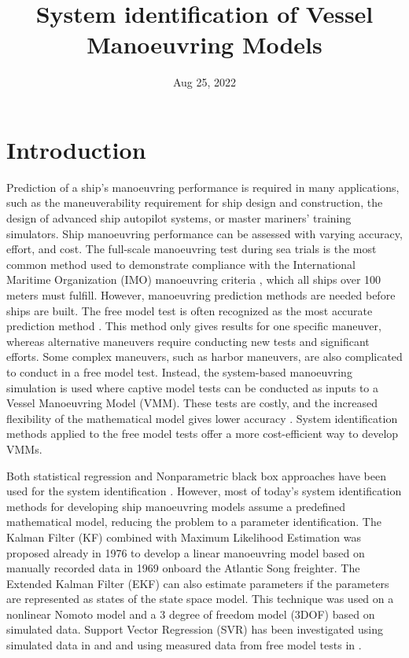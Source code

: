 \documentclass[review]{elsarticle}
\title{System identification of Vessel Manoeuvring Models}
\date{Aug 25, 2022}
\begin{document}



\pagestyle{empty}

\pagestyle{plain}

\pagestyle{normal}
\label{\detokenize{index::doc}}



\section{Introduction}
\label{\detokenize{00.02_introduction:introduction}}\label{\detokenize{00.02_introduction::doc}}
% 
Prediction of a ship's manoeuvring performance is required in many applications, such as the maneuverability requirement for ship design and construction, the design of advanced ship autopilot systems, or master mariners' training simulators. Ship manoeuvring performance can be assessed with varying accuracy, effort, and cost. The full-scale manoeuvring test during sea trials is the most common method used to demonstrate compliance with the International Maritime Organization (IMO) manoeuvring criteria \cite{imo_standards_2002}, which all ships over 100 meters must fulfill. However, manoeuvring prediction methods are needed before ships are built. The free model test is often recognized as the most accurate prediction method \cite{ittc_maneuvering_2008}.
This method only gives results for one specific maneuver, whereas alternative maneuvers require conducting new tests and significant efforts. Some complex maneuvers, such as harbor maneuvers, are also complicated to conduct in a free model test.
Instead, the system-based manoeuvring simulation is used where captive model tests can be conducted as inputs to a Vessel Manoeuvring Model (VMM). These tests are costly, and the increased flexibility of the mathematical model gives lower accuracy \cite{ittc_maneuvering_2008}.
System identification methods applied to the free model tests offer a more cost-efficient way to develop VMMs.

Both statistical regression and Non\sphinxhyphen{}parametric black box approaches have been used for the system identification \cite{he_nonparametric_2022}.  However, most of today's system identification methods for developing ship manoeuvring models assume a predefined mathematical model, reducing the problem to a parameter identification.
The Kalman Filter (KF) combined with Maximum Likelihood Estimation was proposed already in 1976 \cite{astrom_identification_1976} to develop a linear manoeuvring model based on manually recorded data in 1969 onboard the Atlantic Song freighter. The Extended Kalman Filter (EKF) can also estimate parameters if the parameters are represented as states of the state space model. This technique was used on a nonlinear Nomoto model \cite{perera_system_2015} and a 3 degree of freedom model (3DOF) \cite{shi_identification_2009} based on simulated data.
Support Vector Regression (SVR) has been investigated using simulated data in \cite{zhu_parameter_2017} and \cite{wang_parameter_2021} and using measured data from free model tests in \cite{luo_parameter_2016}.
\end{document}
